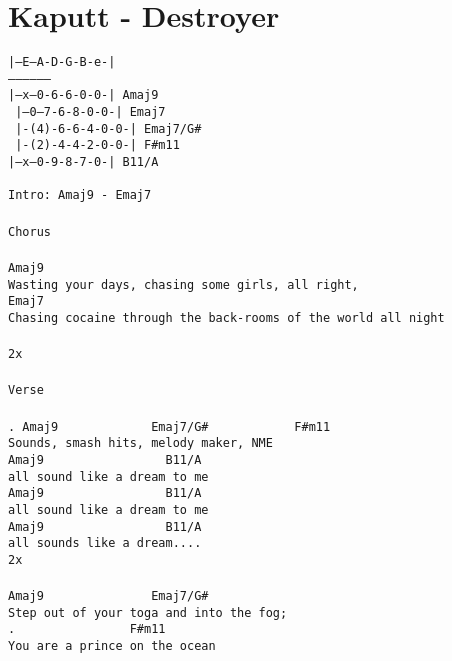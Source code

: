 \newpage
\section{Kaputt - Destroyer}
\label{Kaputt - Destroyer}
\texttt{|--E--A-D-G-B-e-|\\
-----------------\\
|--x--0-6-6-0-0-|  Amaj9\ \ \\\
|--0--7-6-8-0-0-|  Emaj7\ \ \\\
|-(4)-6-6-4-0-0-|  Emaj7/G\#\\\
|-(2)-4-4-2-0-0-|  F\#m11\ \ \\
|--x--0-9-8-7-0-|  B11/A\ \ \\\
\\
Intro:\ Amaj9\ -\ Emaj7\\
\\
Chorus\\
\\
Amaj9\\
Wasting\ your\ days,\ chasing\ some\ girls,\ all\ right,\\
Emaj7\\
Chasing\ cocaine\ through\ the\ back-rooms\ of\ the\ world\ all\ night\\
\\
2x\\
\\
Verse\\
\\
.\ Amaj9\ \ \ \ \ \ \ \ \ \ \ \ \ Emaj7/G\#\ \ \ \ \ \ \ \ \ \ \ \ F\#m11\\
Sounds,\ smash\ hits,\ melody\ maker,\ NME\\
Amaj9\ \ \ \ \ \ \ \ \ \ \ \ \ \ \ \ \ B11/A\\
all\ sound\ like\ a\ dream\ to\ me\\
Amaj9\ \ \ \ \ \ \ \ \ \ \ \ \ \ \ \ \ B11/A\\
all\ sound\ like\ a\ dream\ to\ me\\
Amaj9\ \ \ \ \ \ \ \ \ \ \ \ \ \ \ \ \ B11/A\\
all\ sounds\ like\ a\ dream....\\
2x\\
\\
Amaj9\ \ \ \ \ \ \ \ \ \ \ \ \ \ \ Emaj7/G\#\\
Step\ out\ of\ your\ toga\ and\ into\ the\ fog;\\
.\ \ \ \ \ \ \ \ \ \ \ \ \ \ \ \ F\#m11\\
You\ are\ a\ prince\ on\ the\ ocean\\
}

